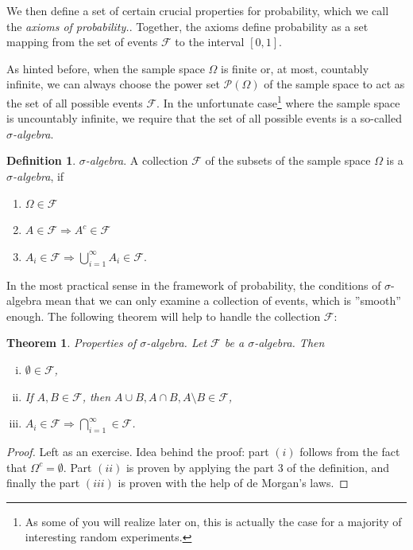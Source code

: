 \documentclass[12pt,a4paper,leqno]{report}
\newcommand{\F}{\mathcal{F}}
\theoremstyle{plain}
\newtheorem{lause}[equation]{Theorem}
\theoremstyle{definition}
\newtheorem{maar}[equation]{Definition}
\begin{document}
We then define a set of certain crucial properties for probability, which we call the \emph{axioms of probability.}. Together, the axioms define probability as a set mapping from the set of events $\mathcal{F}$  to the interval $[0,1]$. 

As hinted before, when the sample space $\Omega$ is finite or, at most, countably infinite, we can always choose the power set $\mathcal{P}(\Omega)$ of the sample space to act as the set of all possible events $\F$. In the unfortunate case\footnote{As some of you will realize later on, this is actually the case for a majority of interesting random experiments.} where the sample space is uncountably infinite, we require that the set of all possible events is a so-called \emph{$\sigma$-algebra}.

\bigskip

\begin{maar} 
\emph{$\sigma$-algebra}. A collection $\F$ of the subsets of the sample space $\Omega$ is a \emph{$\sigma$-algebra}, if 
\begin{enumerate}
\item $\Omega \in \F$
\item $A \in \F \Rightarrow A^c \in \F$
\item $A_i \in \F \Rightarrow \bigcup_{i=1}^\infty A_i \in \F$.
\end{enumerate}
\end{maar}

\bigskip

In the most practical sense in the framework of probability, the conditions of $\sigma$-algebra mean that we can only examine a collection of events, which is ''smooth'' enough. The following theorem will help to handle the collection $\F$:

\begin{lause}
Properties of $\sigma$-algebra. Let $\mathcal{F}$ be a  $\sigma$-algebra. Then
\begin{enumerate}[(i)]
\item $\emptyset \in \mathcal{F}$,
\item If $A,B \in \mathcal{F}$, then $A\cup B, A\cap B, A\setminus B \in\mathcal{F}$,
\item $A_i \in \mathcal{F} \Rightarrow \bigcap_{i=1}^\infty \in \mathcal{F}$.
\end{enumerate}
\end{lause}

\begin{proof}
Left as an exercise. Idea behind the proof: part $(i)$ follows from the fact that $\Omega^c = \emptyset$. Part  $(ii)$ is proven by applying the part 3 of the definition, and finally the part $(iii)$ is proven with the help of de Morgan's laws.
\end{proof}
\end{document}
